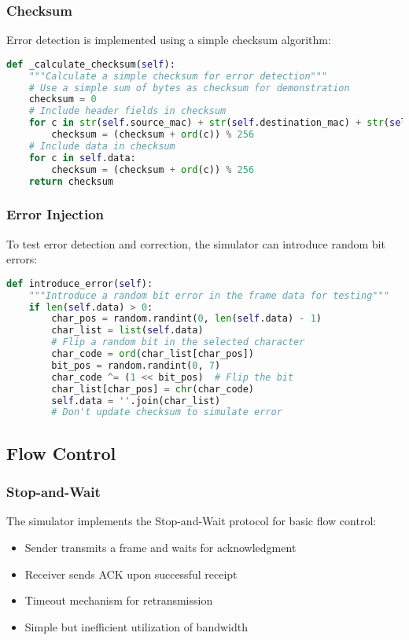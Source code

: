 \documentclass[12pt,a4paper]{article}
\begin{document}
\subsubsection{Checksum}
Error detection is implemented using a simple checksum algorithm:
\begin{lstlisting}[language=Python, caption=Checksum Implementation]
def _calculate_checksum(self):
    """Calculate a simple checksum for error detection"""
    # Use a simple sum of bytes as checksum for demonstration
    checksum = 0
    # Include header fields in checksum
    for c in str(self.source_mac) + str(self.destination_mac) + str(self.sequence_number):
        checksum = (checksum + ord(c)) % 256
    # Include data in checksum
    for c in self.data:
        checksum = (checksum + ord(c)) % 256
    return checksum
\end{lstlisting}

\subsubsection{Error Injection}
To test error detection and correction, the simulator can introduce random bit errors:
\begin{lstlisting}[language=Python, caption=Error Injection]
def introduce_error(self):
    """Introduce a random bit error in the frame data for testing"""
    if len(self.data) > 0:
        char_pos = random.randint(0, len(self.data) - 1)
        char_list = list(self.data)
        # Flip a random bit in the selected character
        char_code = ord(char_list[char_pos])
        bit_pos = random.randint(0, 7)
        char_code ^= (1 << bit_pos)  # Flip the bit
        char_list[char_pos] = chr(char_code)
        self.data = ''.join(char_list)
        # Don't update checksum to simulate error
\end{lstlisting}

\subsection{Flow Control}
\subsubsection{Stop-and-Wait}
The simulator implements the Stop-and-Wait protocol for basic flow control:
\begin{itemize}
    \item Sender transmits a frame and waits for acknowledgment
    \item Receiver sends ACK upon successful receipt
    \item Timeout mechanism for retransmission
    \item Simple but inefficient utilization of bandwidth
\end{itemize}
\end{document}
